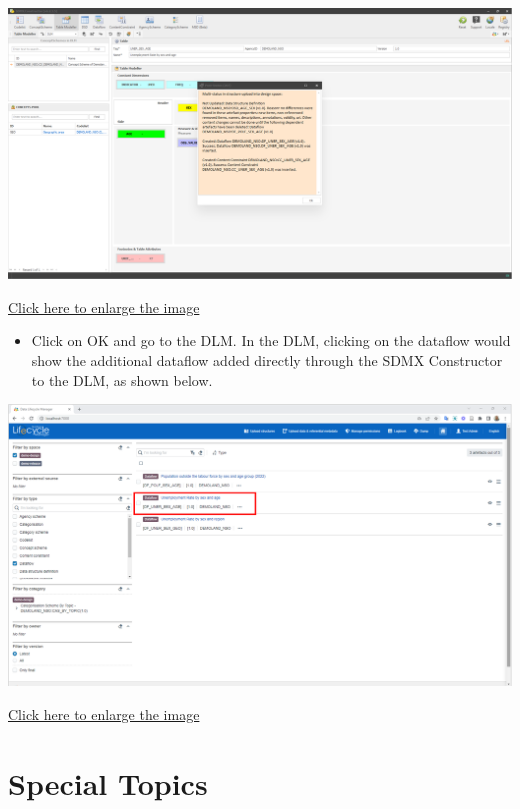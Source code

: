 \documentclass[
]{book}
\providecommand{\tightlist}{%
  \setlength{\itemsep}{0pt}\setlength{\parskip}{0pt}}
\begin{document}
\begin{center}\includegraphics[width=1\linewidth]{./images/image230} \end{center}

\href{images/image230.png}{Click here to enlarge the image}

\begin{itemize}
\tightlist
\item
  Click on OK and go to the DLM. In the DLM, clicking on the dataflow would show the additional dataflow added directly through the SDMX Constructor to the DLM, as shown below.
\end{itemize}

\begin{center}\includegraphics[width=1\linewidth]{./images/image232} \end{center}

\href{images/image232.png}{Click here to enlarge the image}

\hypertarget{special-topics}{%
\chapter{Special Topics}\label{special-topics}}
\end{document}
